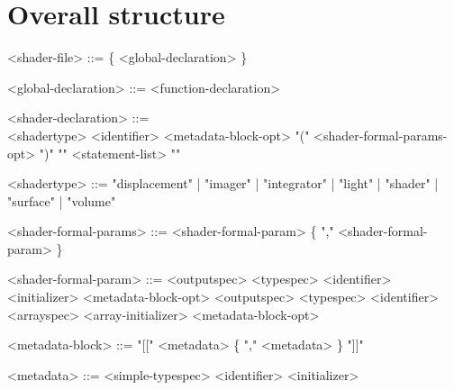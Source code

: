 \documentclass[11pt,letterpaper]{book}
\begin{document}
\section*{Overall structure}

\begin{grammar}
<shader-file> ::= \{ <global-declaration> \}

<global-declaration> ::= <function-declaration> 

<shader-declaration> ::= \spc \\ 
    <shadertype> <identifier> <metadata-block-opt> 
    "(" <shader-formal-params-opt> ")" "{" <statement-list> "}"

<shadertype> ::= "displacement" | "imager" | "integrator" | 
    "light" | "shader" | "surface" | "volume"

<shader-formal-params> ::= <shader-formal-param> \{ "," <shader-formal-param> \}

<shader-formal-param> ::= <outputspec> <typespec> <identifier>
                               <initializer> <metadata-block-opt>
\alt <outputspec> <typespec> <identifier> <arrayspec>
          <array-initializer> <metadata-block-opt>

<metadata-block> ::= "[[" <metadata> \{ "," <metadata> \} "]]"

<metadata> ::= <simple-typespec> <identifier> <initializer>

\end{grammar}
\end{document}
